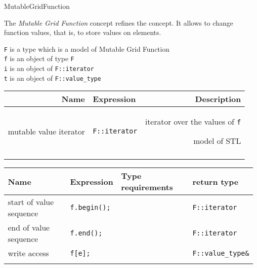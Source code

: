 \begin{Label}{MutableGridFunction}
\end{Label}


The  {\em Mutable Grid Function\/} concept refines the 
 concept.
It allows to change function values, that is,
to store values on elements.



 
{\tt F} is a type which is a model of  Mutable  Grid  Function 
\\
{\tt f} is an object of type  {\tt F}
\\
{\tt i} is an object of  {\tt F::iterator}
\\
{\tt t} is an object of  {\tt F::value\_type}
\\

\begin{tabularx}{14cm}{RlR} 
  \T \hline
  \bf  Name  &\bf  Expression  &\bf  Description   \\ 
  \hline
  mutable value iterator &
  {\tt F::iterator} &
  iterator over the values of {\tt f}
  \par model of STL 
  \T \\   \hline  \\
\end{tabularx}

\begin{tabular}{llll} 
  \T \hline
  \bf  Name  &\bf  Expression  &\bf  Type requirements  & \bf  return type 
  \\ 
  \hline
  start of value sequence  &
  {\tt f.begin();} &
  ~ &
  {\tt F::iterator} 
  \\
  end of value sequence  &
  {\tt f.end();} &
  ~ &
  {\tt F::iterator} 
  \\
  write access &
  {\tt f[e];} &
  ~ &
  {\tt F::value\_type\&} 
  \T \\  \hline  \\
\end{tabular}


